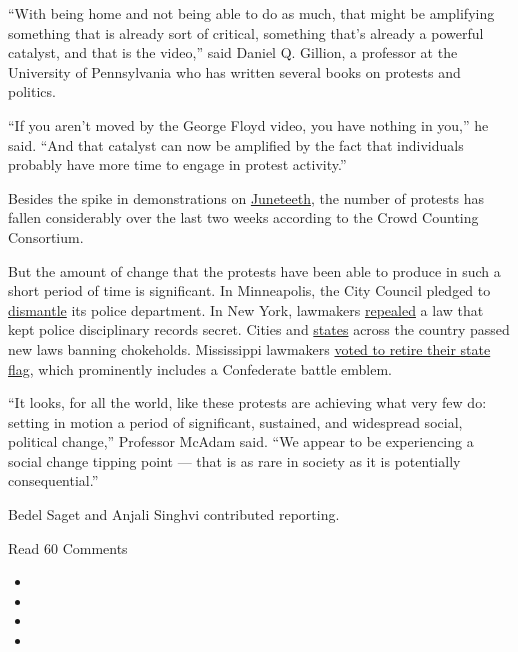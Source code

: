 ``With being home and not being able to do as much, that might be
amplifying something that is already sort of critical, something that's
already a powerful catalyst, and that is the video,'' said Daniel Q.
Gillion, a professor at the University of Pennsylvania who has written
several books on protests and politics.

``If you aren't moved by the George Floyd video, you have nothing in
you,'' he said. ``And that catalyst can now be amplified by the fact
that individuals probably have more time to engage in protest
activity.''

Besides the spike in demonstrations on
\href{https://www.nytimes3xbfgragh.onion/interactive/2020/06/18/style/juneteenth-celebration.html}{Juneteeth},
the number of protests has fallen considerably over the last two weeks
according to the Crowd Counting Consortium.

But the amount of change that the protests have been able to produce in
such a short period of time is significant. In Minneapolis, the City
Council pledged to
\href{https://www.nytimes3xbfgragh.onion/2020/06/07/us/minneapolis-police-abolish.html}{dismantle}
its police department. In New York, lawmakers
\href{https://www.nytimes3xbfgragh.onion/2020/06/12/nyregion/50a-repeal-police-floyd.html}{repealed}
a law that kept police disciplinary records secret. Cities and
\href{https://www.desmoinesregister.com/story/news/politics/2020/06/12/police-misconduct-chokehold-law-governor-kim-reynolds-sign-black-lives-matter-george-floyd/5347514002/}{states}
across the country passed new laws banning chokeholds. Mississippi
lawmakers
\href{https://www.nytimes3xbfgragh.onion/2020/06/28/us/mississippi-flag-confederacy.html?action=click\&pgtype=Article\&state=default\&module=styln_george_floyd_protests_keepup\&variant=1_show\&region=body\&context=keep_up}{voted
to retire their state flag}, which prominently includes a Confederate
battle emblem.

``It looks, for all the world, like these protests are achieving what
very few do: setting in motion a period of significant, sustained, and
widespread social, political change,'' Professor McAdam said. ``We
appear to be experiencing a social change tipping point --- that is as
rare in society as it is potentially consequential.''

Bedel Saget and Anjali Singhvi contributed reporting.

Read 60 Comments

\begin{itemize}
\item
\item
\item
\item
\end{itemize}

